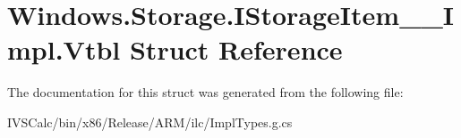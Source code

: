 \hypertarget{struct_windows_1_1_storage_1_1_i_storage_item_____impl_1_1_vtbl}{}\section{Windows.\+Storage.\+I\+Storage\+Item\+\_\+\+\_\+\+Impl.\+Vtbl Struct Reference}
\label{struct_windows_1_1_storage_1_1_i_storage_item_____impl_1_1_vtbl}


The documentation for this struct was generated from the following file\+:\begin{DoxyCompactItemize}
\item 
I\+V\+S\+Calc/bin/x86/\+Release/\+A\+R\+M/ilc/Impl\+Types.\+g.\+cs\end{DoxyCompactItemize}
